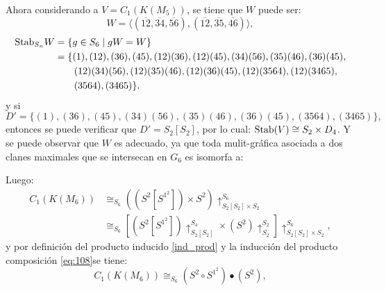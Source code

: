 \documentclass[12pt]{book}
\theoremstyle{definition}
\newcounter{in}
\newcounter{ini}
\begin{document}
Ahora considerando a $V = C_{1}(K(M_5))$, se tiene que $W$ puede ser:
$$W = \langle(\overline{12},\overline{34},\overline{56}),(\overline{12},\overline{35},\overline{46})\rangle,$$
  \begin{equation*}
    \begin{aligned}
      \textup{Stab}_{S_{n}} W &=\{g\in S_{6}\mid gW=W\}\\
      &=\{(1),(12),(36),(45),(12)(36),(12)(45),(34)(56),(35)(46),(36)(45),\\
      &\qquad{}(12)(34)(56),(12)(35)(46),(12)(36)(45),(12)(3564),(12)(3465), \\
      &\qquad{}(3564),(3465)\}.
    \end{aligned}
\end{equation*}
y si
\begin{equation*}
      D' =\{(1),(36),(45),(34)(56),(35)(46),(36)(45),(3564),(3465)\},
\end{equation*}
entonces se puede verificar que $D' = S_{2} \left [ S_{2} \right ]$, por lo cual: $\textup{Stab}(V) \cong S_{2} \times D_{4}$.
Y se puede observar que $W$ es adecuado, ya que toda mulit-gráfica asociada a dos clanes maximales que se intersecan en $G_{6}$ es isomorfa a:
\begin{center}
\end{center}
Luego:
\begin{equation}
\begin{aligned}
C_{1}(K(M_{6})) & \cong_{S_{6}} ((S^{2} \left [ S^{1^{2}} \right ]) \times S^{2}) \uparrow_{S_{2} \left [ S_{2} \right ] \times S_{2}}^{S_{6}} \\
& \cong_{S_{6}} \left [ (S^{2} \left [ S^{1^{2}} \right ]) \uparrow_{S_{2} \left [ S_{2} \right ]}^{S_{4}} \times (S^{2}) \uparrow_{S_{2}}^{S_{2}} \right ] \uparrow_{S_{2} \left [ S_{2} \right ] \times S_{2}}^{S_{6}},
\end{aligned}
\end{equation}
y por definición del producto inducido \ref{ind_prod} y la inducción del producto composición \ref{eq:108}se tiene:
\begin{equation}
C_{1}(K(M_{6})) \cong_{S_{6}} (S^{2}  \circ S^{1^{2}}) \bullet (S^{2}), 
\end{equation}
\end{document}
